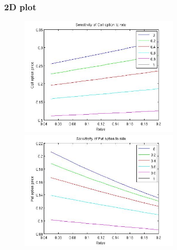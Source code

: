 \documentclass[12pt]{article}
\begin{document}
    \subsubsection*{2D plot}
    \begin{figure}[ht]
    \centering
      \begin{minipage}{.45\textwidth}
        \centering
        \includegraphics[width=3in]{call-rate.jpg}
      \end{minipage}
      \begin{minipage}{.45\textwidth}
        \centering
        \includegraphics[width=3in]{put-rate.jpg}
      \end{minipage}
    \end{figure}
\end{document}
